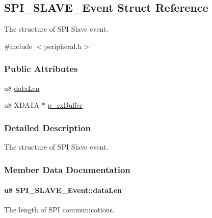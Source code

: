 \hypertarget{struct_s_p_i___s_l_a_v_e___event}{}\subsection{S\+P\+I\+\_\+\+S\+L\+A\+V\+E\+\_\+\+Event Struct Reference}
\label{struct_s_p_i___s_l_a_v_e___event}


The structure of S\+PI Slave event.  




{\ttfamily \#include $<$peripheral.\+h$>$}

\subsubsection*{Public Attributes}
\begin{DoxyCompactItemize}
\item 
u8 \hyperlink{struct_s_p_i___s_l_a_v_e___event_a784b1ea36156fef4c239a7f767fe7f48}{data\+Len}
\item 
u8 X\+D\+A\+TA $\ast$ \hyperlink{struct_s_p_i___s_l_a_v_e___event_a67b8df0c859d79c98a8d1a6f1ad96553}{p\+\_\+rx\+Buffer}
\end{DoxyCompactItemize}


\subsubsection{Detailed Description}
The structure of S\+PI Slave event. 

\subsubsection{Member Data Documentation}
\paragraph[{\texorpdfstring{data\+Len}{dataLen}}]{\setlength{\rightskip}{0pt plus 5cm}u8 S\+P\+I\+\_\+\+S\+L\+A\+V\+E\+\_\+\+Event\+::data\+Len}\hypertarget{struct_s_p_i___s_l_a_v_e___event_a784b1ea36156fef4c239a7f767fe7f48}{}\label{struct_s_p_i___s_l_a_v_e___event_a784b1ea36156fef4c239a7f767fe7f48}
The length of S\+PI communications. 
